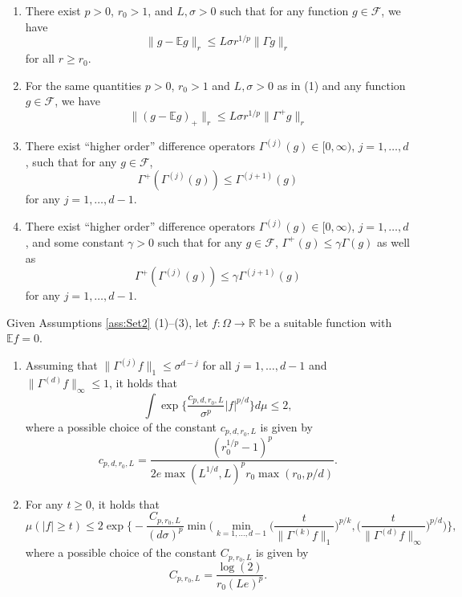 \documentclass[10pt,a4paper]{amsart}
\def\E{{\mathbb E}}
\def\R{{\mathbb R}}
\begin{document}
\begin{assumptions}\label{ass:Set2}
	\begin{enumerate}
		\item There exist $p > 0$, $r_0 > 1$, and $L, \sigma > 0$ such that for any function $g \in \mathcal{F}$, we have
		\begin{equation*}%
			\lVert g - \E g \rVert_r \le L\sigma r^{1/p} \lVert \Gamma g \rVert_r
		\end{equation*}
		for all $r \ge r_0$.
		\item For the same quantities $p > 0$, $r_0 > 1$ and $L, \sigma > 0$ as in (1) and any function $g \in \mathcal{F}$, we have
		\begin{equation*}%
			\lVert (g - \E g)_+ \rVert_r \le L\sigma r^{1/p} \lVert \Gamma^+ g \rVert_r
		\end{equation*}
		\item There exist ``higher order'' difference operators $\Gamma^{(j)}(g) \in [0,\infty)$, $j = 1, \ldots, d$, such that for any $g \in \mathcal{F}$,
		\begin{equation*}%
			\Gamma^+ (\Gamma^{(j)}(g)) \le \Gamma^{(j+1)}(g)
		\end{equation*}
		for any $j = 1, \ldots, d-1$.
		\item[(3')] There exist ``higher order'' difference operators $\Gamma^{(j)}(g) \in [0,\infty)$, $j = 1, \ldots, d$, and some constant $\gamma > 0$ such that for any $g \in \mathcal{F}$, $\Gamma^+(g) \le \gamma \Gamma(g)$ as well as
		\begin{equation*}%
			\Gamma^+ (\Gamma^{(j)}(g)) \le \gamma \Gamma^{(j+1)}(g)
		\end{equation*}
		for any $j = 1, \ldots, d-1$.
	\end{enumerate}
\end{assumptions}

\begin{satz}\label{thm:HigherOrder2}
	Given Assumptions \ref{ass:Set2} (1)--(3), let $f\colon \Omega \to \R$ be a suitable function with $\E f = 0$.
	\begin{enumerate}
		\item Assuming that $\lVert \Gamma^{(j)} f \rVert_1 \le \sigma^{d-j}$ for all $j=1,\ldots,d-1$ and $\lVert \Gamma^{(d)} f \rVert_\infty \le 1$, it holds that
		\[
		\int \exp\Big\{\frac{c_{p,d,r_0,L}}{\sigma^p} |f|^{p/d} \Big\} d\mu \le 2,
		\]
		where a possible choice of the constant $c_{p,d,r_0,L}$ is given by
		\[
		c_{p,d,r_0,L} = \frac{(r_0^{1/p}-1)^p}{2e\max(L^{1/d}, L)^pr_0\max(r_0,p/d)}.
		\]
		\item For any $t\ge 0$, it holds that
		\[
		\mu(|f| \ge t)\le
		2 \exp\Big\{- \frac{C_{p,r_0,L}}{(d\sigma)^p} \min\Big(\min_{k=1, \ldots,d-1} \Big(\frac{t}{\lVert \Gamma^{(k)} f \rVert_1}\Big)^{p/k}, \Big(\frac{t}{\lVert \Gamma^{(d)} f \rVert_\infty}\Big)^{p/d}\Big)\Big\},
		\]
		where a possible choice of the constant $C_{p,r_0,L}$ is given by
		\[
	    C_{p,r_0,L} = \frac{\log(2)}{r_0(Le)^p}.
		\]
	\end{enumerate}
\end{satz}
\end{document}
